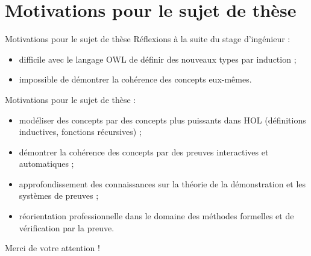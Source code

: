 \documentclass[
  hyperref={
    pdfusetitle,
    pdfencoding=auto,
    psdextra,
    colorlinks=true,
    linkcolor=darkblue,
    citecolor=darkred,
    urlcolor=darkblue,
  },
  9pt,
  aspectratio=169,
]{beamer}
\begin{document}
\section{Motivations pour le sujet de thèse}

\begin{frame}{Motivations pour le sujet de thèse}
  Réflexions à la suite du stage d'ingénieur :
  \begin{itemize}
    \item
      difficile avec le langage \gls{OWL}
      de définir des nouveaux types par induction ;
    \item
      impossible de démontrer la cohérence des concepts eux-mêmes.
  \end{itemize}


  Motivations pour le sujet de thèse :
  \begin{itemize}
    \item
      modéliser des concepts par des concepts plus puissants dans HOL
     (définitions inductives, fonctions récursives) ;
    \item
      démontrer la cohérence des concepts
      par des preuves interactives et automatiques ;
    \item
      approfondissement des connaissances
      sur la théorie de la démonstration et les systèmes de preuves ;
    \item
      réorientation professionnelle
      dans le domaine des méthodes formelles et de vérification par la preuve.
  \end{itemize}

\end{frame}

\begin{frame}[standout]
  Merci de votre attention !
\end{frame}


\end{document}
